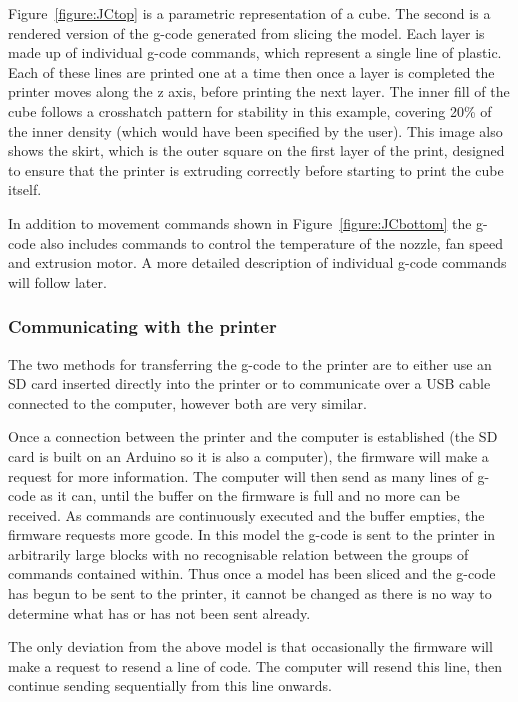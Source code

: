 \documentclass[pdftex, 11pt]{report} %
\begin{document}
Figure~\ref{figure:JCtop} is a parametric representation of a cube. The second is a rendered version of the g-code generated from slicing the model. Each layer is made up of individual g-code commands, which represent a single line of plastic. Each of these lines are printed one at a time then once a layer is completed the printer moves along the z axis, before printing the next layer. The inner fill of the cube follows a crosshatch pattern for stability in this example, covering 20\% of the inner density (which would have been specified by the user). This image also shows the skirt, which is the outer square on the first layer of the print, designed to ensure that the printer is extruding correctly before starting to print the cube itself.

In addition to movement commands shown in Figure~\ref{figure:JCbottom} the g-code also includes commands to control the temperature of the nozzle, fan speed and extrusion motor. A more detailed description of individual g-code commands will follow later.

\subsubsection{Communicating with the printer}
The two methods for transferring the g-code to the printer are to either use an SD card inserted directly into the printer or to communicate over a USB cable connected to the computer, however both are very similar.

Once a connection between the printer and the computer is established (the SD card is built on an Arduino so it is also a computer), the firmware will make a request for more information. The computer will then send as many lines of g-code as it can, until the buffer on the firmware is full and no more can be received. As commands are continuously executed and the buffer empties, the firmware requests more gcode. In this model the g-code is sent to the printer in arbitrarily large blocks with no recognisable relation between the groups of commands contained within. Thus once a model has been sliced and the g-code has begun to be sent to the printer, it cannot be changed as there is no way to determine what has or has not been sent already.

The only deviation from the above model is that occasionally the firmware will make a request to resend a line of code. The computer will resend this line, then continue sending sequentially from this line onwards. 
\end{document}
